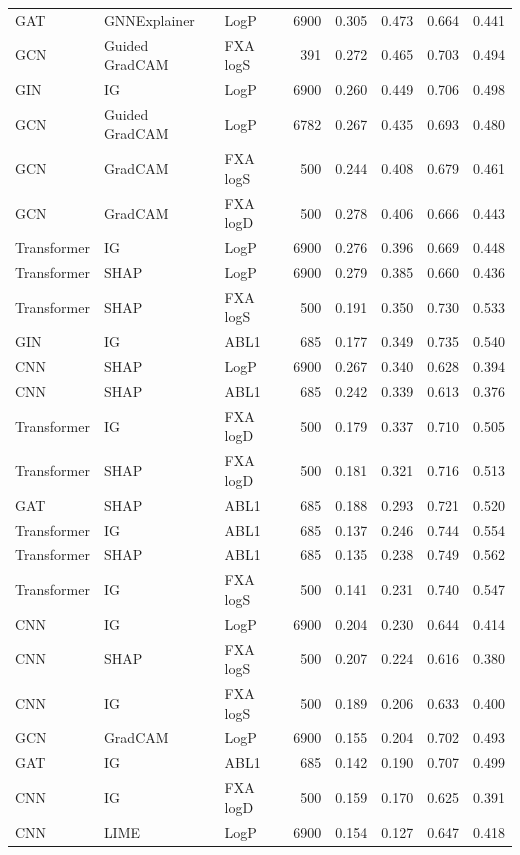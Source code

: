 \begin{table}
\begin{tabular}{lllrllll}
GAT & GNNExplainer & LogP & 6900 & 0.305 & 0.473 & 0.664 & 0.441 \\
GCN & Guided GradCAM & FXA logS & 391 & 0.272 & 0.465 & 0.703 & 0.494 \\
GIN & IG & LogP & 6900 & 0.260 & 0.449 & 0.706 & 0.498 \\
GCN & Guided GradCAM & LogP & 6782 & 0.267 & 0.435 & 0.693 & 0.480 \\
GCN & GradCAM & FXA logS & 500 & 0.244 & 0.408 & 0.679 & 0.461 \\
GCN & GradCAM & FXA logD & 500 & 0.278 & 0.406 & 0.666 & 0.443 \\
Transformer & IG & LogP & 6900 & 0.276 & 0.396 & 0.669 & 0.448 \\
Transformer & SHAP & LogP & 6900 & 0.279 & 0.385 & 0.660 & 0.436 \\
Transformer & SHAP & FXA logS & 500 & 0.191 & 0.350 & 0.730 & 0.533 \\
GIN & IG & ABL1 & 685 & 0.177 & 0.349 & 0.735 & 0.540 \\
CNN & SHAP & LogP & 6900 & 0.267 & 0.340 & 0.628 & 0.394 \\
CNN & SHAP & ABL1 & 685 & 0.242 & 0.339 & 0.613 & 0.376 \\
Transformer & IG & FXA logD & 500 & 0.179 & 0.337 & 0.710 & 0.505 \\
Transformer & SHAP & FXA logD & 500 & 0.181 & 0.321 & 0.716 & 0.513 \\
GAT & SHAP & ABL1 & 685 & 0.188 & 0.293 & 0.721 & 0.520 \\
Transformer & IG & ABL1 & 685 & 0.137 & 0.246 & 0.744 & 0.554 \\
Transformer & SHAP & ABL1 & 685 & 0.135 & 0.238 & 0.749 & 0.562 \\
Transformer & IG & FXA logS & 500 & 0.141 & 0.231 & 0.740 & 0.547 \\
CNN & IG & LogP & 6900 & 0.204 & 0.230 & 0.644 & 0.414 \\
CNN & SHAP & FXA logS & 500 & 0.207 & 0.224 & 0.616 & 0.380 \\
CNN & IG & FXA logS & 500 & 0.189 & 0.206 & 0.633 & 0.400 \\
GCN & GradCAM & LogP & 6900 & 0.155 & 0.204 & 0.702 & 0.493 \\
GAT & IG & ABL1 & 685 & 0.142 & 0.190 & 0.707 & 0.499 \\
CNN & IG & FXA logD & 500 & 0.159 & 0.170 & 0.625 & 0.391 \\
CNN & LIME & LogP & 6900 & 0.154 & 0.127 & 0.647 & 0.418 \\

\end{tabular}
\end{table}
